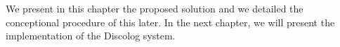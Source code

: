 We present in this chapter the proposed solution and we detailed the conceptional procedure of this later. In the next chapter, we will present the implementation of the Discolog system.
%
%
%
%
%
%
%

